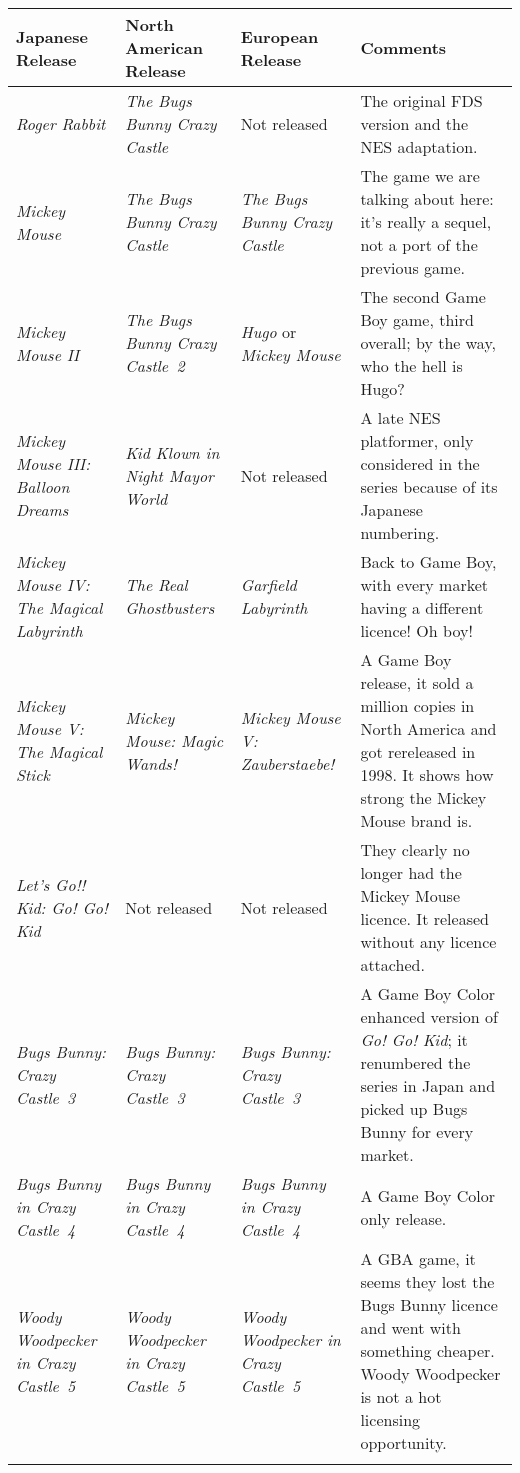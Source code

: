 \documentclass{book}
\let\oldcenter\center
\let\oldendcenter\endcenter
\renewenvironment{center}{\setlength\topsep{0pt}\oldcenter}{\oldendcenter}
\begin{document}
\begin{center} \footnotesize\begin{tabulary}{\textwidth}{LLLL} \hline
\textbf{Japanese Release} & \textbf{North American Release} & \textbf{European Release} & \textbf{Comments} \\
\hline
\emph{Roger Rabbit} & \emph{The Bugs Bunny Crazy Castle} & Not released & The original FDS version and the NES adaptation. \\
\hline
\emph{Mickey Mouse} & \emph{The Bugs Bunny Crazy Castle} & \emph{The Bugs Bunny Crazy Castle} & The game we are talking about here: it’s really a sequel, not a port of the previous game. \\
\hline
\emph{Mickey Mouse II} & \emph{The Bugs Bunny Crazy Castle~2} & \emph{Hugo} or \emph{Mickey Mouse} & The second Game Boy game, third overall; by the way, who the hell is Hugo? \\
\hline
\emph{Mickey Mouse III: Balloon Dreams} & \emph{Kid Klown in Night Mayor World} & Not released & A late NES platformer, only considered in the series because of its Japanese numbering. \\
\hline
\emph{Mickey Mouse IV: The Magical Labyrinth} & \emph{The Real Ghostbusters} & \emph{Garfield Labyrinth} & Back to Game Boy, with every market having a different licence! Oh boy! \\
\hline
\emph{Mickey Mouse V: The Magical Stick} & \emph{Mickey Mouse: Magic Wands!} & \emph{Mickey Mouse V: Zauberstaebe!} & A Game Boy release, it sold a million copies in North America and got rereleased in 1998. It shows how strong the Mickey Mouse brand is. \\
\hline
\emph{Let’s Go!! Kid: Go! Go! Kid} & Not released & Not released & They clearly no longer had the Mickey Mouse licence. It released without any licence attached. \\
\hline
\emph{Bugs Bunny: Crazy Castle~3} & \emph{Bugs Bunny: Crazy Castle~3} & \emph{Bugs Bunny: Crazy Castle~3} & A Game Boy Color enhanced version of \emph{Go! Go! Kid}; it renumbered the series in Japan and picked up Bugs Bunny for every market. \\
\hline
\emph{Bugs Bunny in Crazy Castle~4} & \emph{Bugs Bunny in Crazy Castle~4} & \emph{Bugs Bunny in Crazy Castle~4} & A Game Boy Color only release. \\
\hline
\emph{Woody Woodpecker in Crazy Castle~5} & \emph{Woody Woodpecker in Crazy Castle~5} & \emph{Woody Woodpecker in Crazy Castle~5} & A GBA game, it seems they lost the Bugs Bunny licence and went with something cheaper. Woody Woodpecker is not a hot licensing opportunity. \\
\hline \normalsize\end{tabulary} \end{center}
\end{document}

